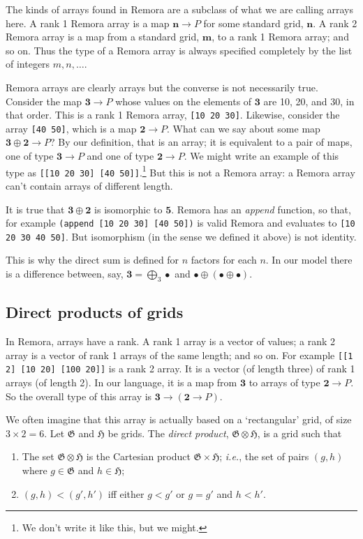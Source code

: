 \documentclass[11pt]{article}
\newcommand{\gr}[1]{\mathfrak{#1}}
\newcommand{\unit}{\bullet}
\newcommand{\two}{\mathbf{2}}
\newcommand{\three}{\mathbf{3}}
\begin{document}
The kinds of arrays found in Remora are a subclass of what we are calling arrays
here. A rank 1 Remora array is a map \(\mathbf{n}\to P\) for some standard grid,
\(\mathbf{n}\). A rank 2 Remora array is a map from a standard grid,
\(\mathbf{m}\), to a rank 1 Remora array; and so on. Thus the type of a Remora
array is always specified completely by the list of integers \(m, n, \dotsc\).

Remora arrays are clearly arrays but the converse is not necessarily
true. Consider the map \(\mathbf{3}\to P\) whose values on the elements of
\(\mathbf{3}\) are 10, 20, and 30, in that order. This is a rank 1 Remora array,
\verb|[10 20 30]|. Likewise, consider the array \verb|[40 50]|, which is a map
\(\mathbf{2}\to P\). What can we say about some map \(\mathbf{3}\oplus\mathbf{2}\to P\)?
By our definition, that is an array; it is equivalent to a pair of maps, one of
type \(\mathbf{3}\to P\) and one of type \(\mathbf{2}\to P\). We might write an
example of this type as \texttt{[[10 20 30] [40 50]]}.\footnote{We don't write
it like this, but we might.} But this is not a Remora array: a Remora array
can't contain arrays of different length.

It is true that \(\mathbf{3}\oplus\mathbf{2}\) is isomorphic to \(\mathbf{5}\).
Remora has an \emph{append} function, so that, for example \texttt{(append [10
    20 30] [40 50])} is valid Remora and evaluates to \texttt{[10 20 30 40 50]}.
But isomorphism (in the sense we defined it above) is not identity.

This is why the direct sum is defined for $n$ factors for each $n$. In our model
there is a difference between, say, $\mathbf{3} = \bigoplus_3 \unit$ and $\unit
\oplus (\unit \oplus \unit)$.


\subsection{Direct products of grids}

In Remora, arrays have a rank. A rank 1 array is a vector of values; a rank 2
array is a vector of rank 1 arrays of the same length; and so on.  For example
\verb|[[1 2] [10 20] [100 20]]| is a rank 2 array. It is a vector (of length
three) of rank 1 arrays (of length 2). In our language, it is a map from $\three$
to arrays of type $\two \to P$. So the overall type of this array is $\three \to
(\two \to P)$.

We often imagine that this array is actually based on a `rectangular' grid, of
size $3 \times 2 = 6$. Let $\gr{G}$ and $\gr{H}$ be grids. The \emph{direct product},
$\gr{G}\otimes\gr{H}$, is a grid such that
\begin{enumerate}
\item The set $\gr{G}\otimes\gr{H}$ is the Cartesian product $\gr{G} \times \gr{H}$;
 \emph{i.e.}, the set of pairs $(g, h)$ where $g\in\gr{G}$ and $h\in\gr{H}$;
\item $(g, h) < (g', h')$ iff either $g < g'$ or $g = g'$ and $h < h'$. 
\end{enumerate}
\end{document}
